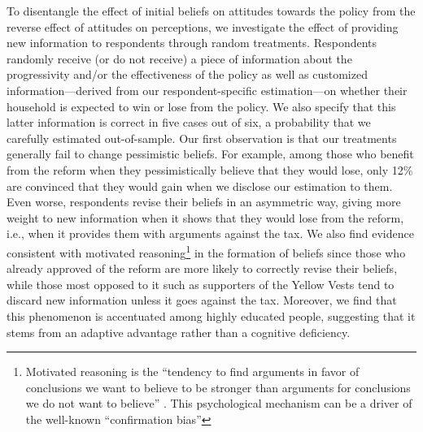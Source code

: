 \documentclass[12pt]{article} %
\begin{document}
To disentangle the effect of initial beliefs on attitudes towards the policy from the reverse effect of attitudes on perceptions, we investigate the effect of providing new information to respondents through random treatments. Respondents randomly receive (or do not receive) a piece of information about the progressivity and/or the effectiveness of the policy as well as customized information---derived from our respondent-specific estimation---on whether their household is expected to win or lose from the policy. We also specify that this latter information is correct in five cases out of six, a probability that we carefully estimated out-of-sample. Our first observation is that our treatments generally fail to change pessimistic beliefs. For example, among those who benefit from the reform when they pessimistically believe that they would lose, only 12\% are convinced that they would gain when we disclose our estimation to them. Even worse, respondents revise their beliefs in an asymmetric way, giving more weight to new information when it shows that they would lose from the reform, i.e., when it provides them with arguments against the tax. We also find evidence consistent with motivated reasoning\footnote{Motivated reasoning is the ``tendency to find arguments in favor of conclusions we want to believe to be stronger than arguments for conclusions we do not want to believe'' \citep{ziva_kunda_case_1990}. This psychological mechanism can be a driver of the well-known ``confirmation bias''} in the formation of beliefs since those who already approved of the reform are more likely to correctly revise their beliefs, while those most opposed to it such as supporters of the Yellow Vests tend to discard new information unless it goes against the tax. Moreover, we find that this phenomenon is accentuated among highly educated people, suggesting that it stems from an adaptive advantage rather than a cognitive deficiency.
\end{document}
